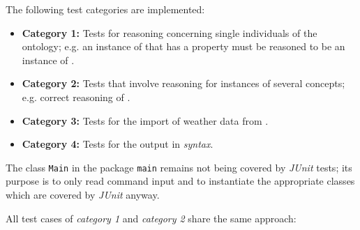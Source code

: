 The following test categories are implemented:
\begin{itemize}
  \item \textbf{Category 1:} Tests for  reasoning concerning single individuals of the ontology; e.g. an instance of  that has a  property must be reasoned to be an instance of .
  \item \textbf{Category 2:} Tests that involve reasoning for instances of several concepts; e.g. correct reasoning of .
  \item \textbf{Category 3:} Tests for the import of weather data from \yrno.
  \item \textbf{Category 4:} Tests for the output in \emph{ syntax}.
\end{itemize}

The class \texttt{Main} in the package \texttt{main} remains not being covered by \emph{JUnit} tests; its purpose is to only read command input and to instantiate the appropriate classes which are covered by \emph{JUnit} anyway.

All test cases of \emph{category 1} and \emph{category 2} share the same approach:


